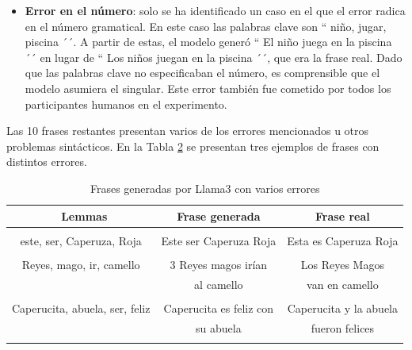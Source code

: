 \documentclass[11pt,spanish,listoffigures,listoftables]{tfgetsinf}
\begin{document}
\begin{itemize}
\begin{table}[!h]
\begin{center}
\begin{tabular}{ c | c | c }
\end{tabular}
\end{center}
\label{tab:erroresSujeto}
\end{table}

	\item \textbf{Error en el número}: solo se ha identificado un caso en el que el error radica en el número gramatical. En este caso las palabras clave son `` niño, jugar, piscina ´´. A partir de estas, el modelo generó `` El niño juega en la piscina ´´ en lugar de  `` Los niños juegan en la piscina ´´, que era la frase real. Dado que las palabras clave no especificaban el número, es comprensible que el modelo asumiera el singular. Este error también fue cometido por todos los participantes humanos en el experimento.
\end{itemize}

Las 10 frases restantes presentan varios de los errores mencionados u otros problemas sintácticos. En la Tabla \ref{tab:erroresVariados} se presentan tres ejemplos de frases con distintos errores.

\begin{table}[!h]
\caption{Frases generadas por Llama3 con varios errores}
\begin{center}
\begin{tabular}{ c | c | c }
	\ Lemmas & Frase generada & Frase real \\
	\hline
	\hline
	 & & \\
	 este, ser, Caperuza, Roja & Este ser Caperuza Roja & Esta es Caperuza Roja  \\
	 & & \\
	Reyes, mago, ir, camello & 3 Reyes magos irían & Los Reyes Magos \\
	 & al camello & van en camello \\
	 & & \\
	Caperucita, abuela, ser, feliz & Caperucita es feliz con & Caperucita y la abuela  \\
	 & su abuela & fueron felices \\
	 & & \\

\end{tabular}
\end{center}
\label{tab:erroresVariados}
\end{table}

\end{document}
